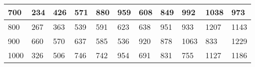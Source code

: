 \documentclass[10pt,letterpaper]{article}
\begin{document}
\begin{center}
\begin{table}
\begin{tabular} { |m{0.5cm}|m{1.3cm}|m{1.3cm}|m{1.3cm}|m{1.3cm}|m{1.3cm}|m{1.3cm}|m{1.3cm}|m{1.3cm}|m{1.3cm}|m{1.3cm}|}
\hline
\cellcolor{Gray}700 & \Large 234 & \Large 426 & \Large 571 & \Large 880 & \Large 959 & \Large 608 & \Large 849 & \Large 992 & \Large 1038 & \Large 973 \\
\hline
\cellcolor{Gray}800 & \Large 267 & \Large 363 & \Large 539 & \Large 591 & \Large 623 & \Large 638 & \Large 951 & \Large 933 & \Large 1207 & \Large 1143 \\
\hline
\cellcolor{Gray}900 & \Large 660 & \Large 570 & \Large 637 & \Large 585 & \Large 536 & \Large 920 & \Large 878 & \Large 1063 & \Large 833 & \Large 1229 \\
\hline
\cellcolor{Gray}1000 & \Large 326 & \Large 506 & \Large 746 & \Large 742 & \Large 954 & \Large 691 & \Large 831 & \Large 755 & \Large 1127 & \Large 1186 \\
\hline
\end{tabular} \\
\end{table}
\end{center}
\newpage 
{}
\end{document}
